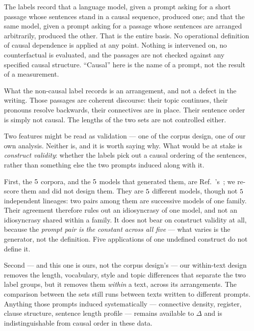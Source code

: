 \documentclass[11pt]{article}
\begin{document}
The labels record that a language model, given a prompt asking for a short
passage
whose sentences stand in a causal sequence, produced one; and that the same
model, given a prompt asking for a passage whose sentences are arranged
arbitrarily, produced the other.  That is the entire basis.  No operational
definition of causal dependence is applied at any point.  Nothing is
intervened on, no counterfactual is evaluated, and the passages are not checked
against any specified causal structure.  ``Causal'' here is the name of a
prompt, not the result of a measurement.

What the non-causal label records is an arrangement, and not a defect in the
writing.  Those passages are coherent discourse: their topic continues,
their pronouns resolve backwards, their connectives are in place.  Their
sentence order is simply not causal.  The lengths of the two sets are not
controlled either.

Two features might be read as validation --- one of the corpus design, one
of our own analysis.  Neither is, and it is worth saying why.  What would
be at stake is \emph{construct validity}: whether the labels pick out a
causal ordering of the sentences, rather than something else the two
prompts induced along with it.

First, the $5$ corpora, and the $5$ models that generated them,
are Ref.~\cite{sagawa2026}'s~\cite[Sec.~V~B]{sagawa2026}; we re-score them
and did not design them.  They are $5$ different models, though not
$5$ independent lineages: two pairs among them are
successive models of one family.  Their agreement therefore rules out an
idiosyncrasy of one model, and not an idiosyncrasy shared within a
family.  It does not
bear on construct validity at all, because the \emph{prompt pair is the
constant across all five} --- what varies is the generator, not the definition.
Five applications of one undefined construct do not define it.

Second --- and this one is ours, not the corpus design's --- our
within-text design removes the length, vocabulary, style and topic differences that separate the two label groups, but it removes them \emph{within} a
text, across its arrangements.  The comparison between the sets still runs
between texts written to different prompts.  Anything those prompts induced
systematically --- connective density, register, clause structure, sentence
length profile --- remains available to $\Delta$ and is indistinguishable from
causal order in these data.
\end{document}
